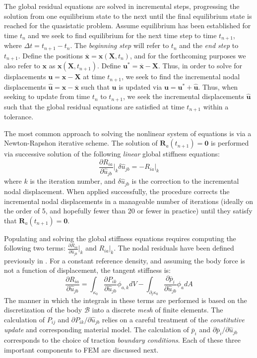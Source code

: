 The global residual equations are solved in incremental steps, progressing the solution from one equilibrium state to the next until the final equilibrium state is reached for the quasistatic problem. Assume equilibrium has been established for time $t_n$ and we seek to find equilibrium for the next time step to time $t_{n+1}$, where $\Delta{t} = t_{n+1} - t_{n}$. The \textit{beginning step} will refer to $t_n$ and the \textit{end step} to $t_{n+1}$. Define the positions $\overline{\bm{x}} = \bm{x}(\bm{X},t_n)$, and for the forthcoming purposes we also refer to ${\bm{x}}$ as $\bm{x}(\bm{X},t_{n+1})$. Define ${\bm{u}}^* = \overline{\bm{x}} - \bm{X}$. Thus, in order to solve for displacements $\bm{u} = \bm{x} - \bm{X}$ at time $t_{n+1}$, we seek to find the incremental nodal displacements $\hat{\bm{u}} = \bm{x} - \overline{\bm{x}}$ such that $\bm{u}$ is updated via $\bm{u} = {\bm{u}}^* + \hat{\bm{u}}$. Thus, when seeking to update from time $t_n$ to $t_{n+1}$, we seek the incremental displacements $\hat{\bm{u}}$ such that the global residual equations are satisfied at time $t_{n+1}$ within a tolerance.

The most common approach to solving the nonlinear system of equations is via a Newton-Rapshon iterative scheme. The solution of $\bm{R}_a(t_{n+1}) = \bm{0}$ is performed via successive solution of the following \textit{linear} global stiffness equations:
\begin{equation}
\frac{\partial R_{ia}}{\partial \hat{u}_{jb}} \bigg|_k \delta\hat{u}_{jb} = -R_{ia}\bigg|_k
\label{eqn:newtonraphson}
\end{equation}
where $k$ is the iteration number, and $\delta\hat{u}_{jb}$ is the correction to the incremental nodal displacement. When applied successfully, the procedure corrects the incremental nodal displacements in a manageable number of iterations (ideally on the order of 5, and hopefully fewer than 20 or fewer in practice) until they satisfy that $\bm{R}_a(t_{n+1}) = \bm{0}$.

Populating and solving the global stiffness equations requires computing the following two terms: $\frac{\partial R_{ia}}{\partial \hat{u}_{jb}} \big|_k$ and $R_{ia}\big|_k$. The nodal residuals have been defined previously in . For a constant reference density, and assuming the body force is not a function of displacement, the tangent stiffness is:
\begin{equation}
\frac{\partial R_{ia}}{\partial \hat{u}_{jb}} = \int_{\kappa_0}\frac{\partial P_{ik}}{\partial \hat{u}_{jb}}\phi_{a,k}dV - \int_{\partial_t\kappa_0}\frac{\partial \overline{p}_i}{\partial \hat{u}_{jb}}\phi_adA
\end{equation}
The manner in which the integrals in these terms are performed is based on the discretization of the body $\mathcal{B}$ into a discrete \textit{mesh} of finite elements. The calculation of $P_{ij}$ and $\partial{P}_{ik}/\partial{\hat{u}_{jb}}$ relies on a careful treatment of the \textit{constitutive update} and corresponding material model. The calculation of $\overline{p}_i$ and $\partial{\overline{p}_i}/\partial{\hat{u}_{jb}}$ corresponds to the choice of traction \textit{boundary conditions}. Each of these three important components to FEM are discussed next.

